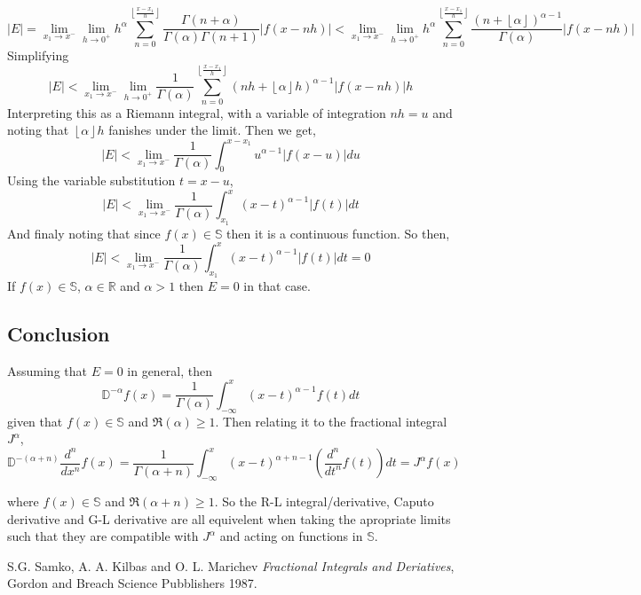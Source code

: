\documentclass[%
 preprint,
 amsmath, amssymb, aps, pra, 10pt
]{revtex4-2}
\begin{document}
\[\left|E\right| = \lim_{x_1 \to x^-} \lim_{h \to 0^+} h^{\alpha} \sum_{n=0}^{\left\lfloor \frac{x-x_1}{h} \right\rfloor} \frac{\Gamma(n+\alpha)}{\Gamma(\alpha)\Gamma(n + 1)} \left| f(x-nh) \right| < \lim_{x_1 \to x^-} \lim_{h \to 0^+} h^{\alpha} \sum_{n=0}^{\left\lfloor \frac{x-x_1}{h} \right\rfloor} \frac{(n + \left\lfloor \alpha \right\rfloor)^{\alpha - 1}}{\Gamma(\alpha)} \left| f(x-nh) \right|\]
Simplifying
\[\left|E\right| < \lim_{x_1 \to x^-} \lim_{h \to 0^+} \frac{1}{\Gamma(\alpha)} \sum_{n=0}^{\left\lfloor \frac{x-x_1}{h} \right\rfloor} (nh + \left\lfloor \alpha \right\rfloor h)^{\alpha - 1} \left| f(x-nh) \right|h \]
Interpreting this as a Riemann integral, with a variable of integration $nh=u$ and noting that $\left\lfloor \alpha \right\rfloor h$ fanishes under the limit. Then we get,
\[\left|E\right| < \lim_{x_1 \to x^-} \frac{1}{\Gamma(\alpha)} \int_{0}^{x-x_1} u^{\alpha - 1} \left| f(x-u) \right|du \]
Using the variable substitution $t = x-u$,
\[\left|E\right| < \lim_{x_1 \to x^-} \frac{1}{\Gamma(\alpha)} \int_{x_1}^{x} (x-t)^{\alpha - 1} \left| f(t) \right|dt \]
And finaly noting that since $f(x) \in \mathbb{S}$ then it is a continuous function. So then,
\[\left|E\right| < \lim_{x_1 \to x^-} \frac{1}{\Gamma(\alpha)} \int_{x_1}^{x} (x-t)^{\alpha - 1} \left| f(t) \right|dt = 0\]
If $f(x) \in \mathbb{S}$, $\alpha \in \mathbb{R}$ and $\alpha > 1$ then $E = 0$ in that case.

\subsection{Conclusion}
Assuming that $E=0$ in general, then
\[\mathbb{D}^{-\alpha}f(x) = \frac{1}{\Gamma(\alpha)} \int_{-\infty}^x (x - t)^{\alpha - 1} f(t)dt\]
given that $f(x) \in \mathbb{S}$ and $\mathfrak{R}(\alpha) \geq 1$. Then relating it to the fractional integral $J^{\alpha}$,
\begin{equation}
\mathbb{D}^{-(\alpha+n)}\frac{d^n}{dx^n}f(x) = \frac{1}{\Gamma(\alpha + n)} \int_{-\infty}^x (x-t)^{\alpha + n - 1} \left( \frac{d^n}{dt^n} f(t) \right) dt = J^{\alpha}f(x)
\label{Grunwald-LetnikovCalculus}
\end{equation}

where $f(x) \in \mathbb{S}$ and $\mathfrak{R}(\alpha + n) \geq 1$. So the R-L integral/derivative, Caputo derivative and G-L derivative are all equivelent when taking the apropriate limits such that they are compatible with $J^\alpha$ and acting on functions in $\mathbb{S}$.

\begin{thebibliography}{1}

  S.G. Samko, A. A. Kilbas and O. L. Marichev
  \textit{Fractional Integrals and Deriatives},
  Gordon and Breach Science Pubblishers
  1987.

\end{thebibliography}
\end{document}
